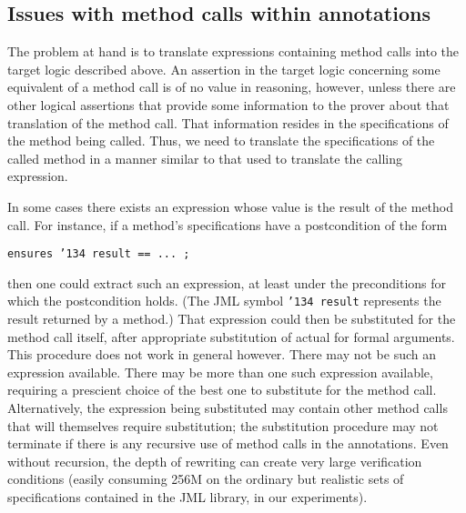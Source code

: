 \documentclass{sig-alternate}
\begin{document}
\subsection{Issues with method calls within annotations}

The problem at hand is to translate expressions containing method calls into the target logic described above.  An assertion in the target logic concerning some equivalent of a method call is of no value in reasoning, however, unless there are other logical assertions that provide some 
information to the prover about that translation of the method call.  That information resides in
the specifications of the method being called.  Thus, we need to translate the specifications
of the called method
in a manner similar to that used to translate the calling expression.

In some cases there exists an expression whose value is the result of the method call.  For
instance, if a method's specifications have a postcondition of the form
\begin{center}\texttt{ensures \char'134 result == ... ; }\end{center}
then one could extract such an expression, at least under the preconditions for which the
postcondition holds.  (The JML symbol \texttt{\char'134 result} represents the result returned by a method.)  
That expression could then be substituted for the method call itself,
after appropriate substitution of actual for formal arguments.  This procedure does not work
in general however.  There may not be such an expression available.  There may be more than
one such
expression available, requiring a prescient choice of the best one to substitute for the method call.
Alternatively, the expression being substituted may contain other method calls that
will themselves require substitution; the substitution procedure may not terminate if there is
any recursive use of method calls in the annotations.  Even without recursion, the depth of
rewriting can create very large verification conditions (easily consuming 256M on the ordinary
but realistic sets of specifications contained in the JML library, in our experiments).
\end{document}

